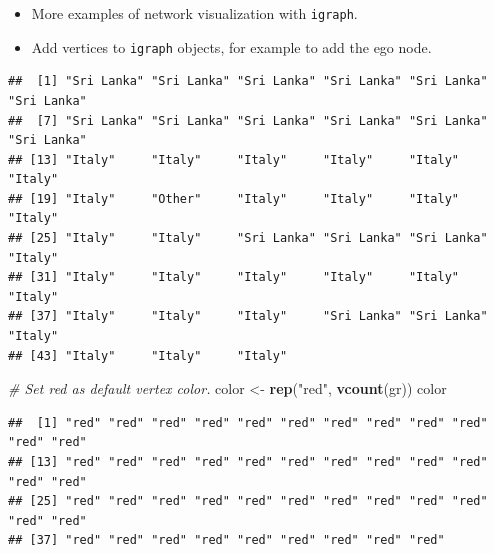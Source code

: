 \documentclass[
]{book}
\newenvironment{Shaded}{\begin{snugshade}}{\end{snugshade}}
\newcommand{\CommentTok}[1]{\textcolor[rgb]{0.56,0.35,0.01}{\textit{#1}}}
\newcommand{\FloatTok}[1]{\textcolor[rgb]{0.00,0.00,0.81}{#1}}
\newcommand{\FunctionTok}[1]{\textcolor[rgb]{0.13,0.29,0.53}{\textbf{#1}}}
\newcommand{\NormalTok}[1]{#1}
\newcommand{\OtherTok}[1]{\textcolor[rgb]{0.56,0.35,0.01}{#1}}
\newcommand{\SpecialCharTok}[1]{\textcolor[rgb]{0.81,0.36,0.00}{\textbf{#1}}}
\newcommand{\StringTok}[1]{\textcolor[rgb]{0.31,0.60,0.02}{#1}}
\providecommand{\tightlist}{%
  \setlength{\itemsep}{0pt}\setlength{\parskip}{0pt}}
\begin{document}
\begin{itemize}
\tightlist
\item
  More examples of network visualization with \texttt{igraph}.
\item
  Add vertices to \texttt{igraph} objects, for example to add the ego node.
\end{itemize}

\begin{Shaded}
\end{Shaded}

\begin{verbatim}
##  [1] "Sri Lanka" "Sri Lanka" "Sri Lanka" "Sri Lanka" "Sri Lanka" "Sri Lanka"
##  [7] "Sri Lanka" "Sri Lanka" "Sri Lanka" "Sri Lanka" "Sri Lanka" "Sri Lanka"
## [13] "Italy"     "Italy"     "Italy"     "Italy"     "Italy"     "Italy"    
## [19] "Italy"     "Other"     "Italy"     "Italy"     "Italy"     "Italy"    
## [25] "Italy"     "Italy"     "Sri Lanka" "Sri Lanka" "Sri Lanka" "Italy"    
## [31] "Italy"     "Italy"     "Italy"     "Italy"     "Italy"     "Italy"    
## [37] "Italy"     "Italy"     "Italy"     "Sri Lanka" "Sri Lanka" "Italy"    
## [43] "Italy"     "Italy"     "Italy"
\end{verbatim}

\begin{Shaded}
\begin{Highlighting}[]
\CommentTok{\# Set red as default vertex color.}
\NormalTok{color }\OtherTok{\textless{}{-}} \FunctionTok{rep}\NormalTok{(}\StringTok{"red"}\NormalTok{, }\FunctionTok{vcount}\NormalTok{(gr))}
\NormalTok{color}
\end{Highlighting}
\end{Shaded}

\begin{verbatim}
##  [1] "red" "red" "red" "red" "red" "red" "red" "red" "red" "red" "red" "red"
## [13] "red" "red" "red" "red" "red" "red" "red" "red" "red" "red" "red" "red"
## [25] "red" "red" "red" "red" "red" "red" "red" "red" "red" "red" "red" "red"
## [37] "red" "red" "red" "red" "red" "red" "red" "red" "red"
\end{verbatim}
\end{document}
